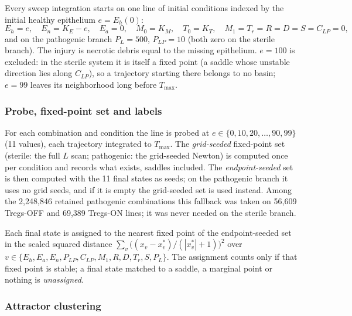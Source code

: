 \documentclass[11pt]{article}
\begin{document}
Every sweep integration starts on one line of initial conditions indexed by the initial
healthy epithelium $e = E_h(0)$:
\begin{equation}
E_h = e,\quad E_n = K_E - e,\quad E_a = 0,\quad M_0 = K_M,\quad T_0 = K_T,\quad
M_1 = T_r = R = D = S = C_{LP} = 0,
\label{eq:icline}
\end{equation}
and on the pathogenic branch $P_L = 500$, $P_{LP} = 10$ (both zero on the sterile
branch). The injury is necrotic debris equal to the missing epithelium. $e = 100$ is
excluded: in the sterile system it is itself a fixed point (a saddle whose unstable
direction lies along $C_{LP}$), so a trajectory starting there belongs to no basin;
$e = 99$ leaves its neighborhood long before $T_{\max}$.

\subsubsection{Probe, fixed-point set and labels}

For each combination and condition the line is probed at
$e \in \{0, 10, 20, \dots, 90, 99\}$ (11 values), each trajectory integrated to $T_{\max}$.
The \emph{grid-seeded} fixed-point set (sterile: the full $L$ scan; pathogenic: the
grid-seeded Newton) is computed once per condition and records what exists, saddles
included. The \emph{endpoint-seeded} set is then computed with the 11 final states as
seeds; on the pathogenic branch it uses no grid seeds, and if it is empty the
grid-seeded set is used instead. Among the 2,248,846 retained pathogenic combinations
this fallback was taken on 56,609 Tregs-OFF and 69,389 Tregs-ON lines; it was never
needed on the sterile branch.

Each final state is assigned to the nearest fixed point of the endpoint-seeded set in
the scaled squared distance $\sum_v \big((x_v - x_v^*)/(|x_v^*| + 1)\big)^2$ over
$v \in \{E_h, E_a, E_n, P_{LP}, C_{LP}, M_1, R, D, T_r, S, P_L\}$. The assignment counts
only if that fixed point is stable; a final state matched to a saddle, a marginal
point or nothing is \emph{unassigned}.

\subsubsection{Attractor clustering}
\label{sec:clustering}
\end{document}
